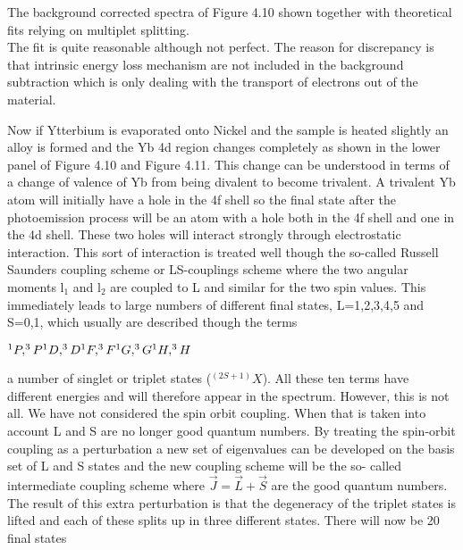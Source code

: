              The background corrected
        spectra of Figure 4.10 shown together with theoretical fits
        relying on multiplet splitting.\\

             The fit is quite reasonable although not perfect. The
          reason for discrepancy is that intrinsic energy loss
          mechanism are not included in the background subtraction
          which is only dealing with the transport of electrons out of
          the material.




             Now if Ytterbium is evaporated onto Nickel and the sample
          is heated slightly an alloy is formed and the Yb 4d region
          changes completely as shown in the lower panel of Figure 4.10
          and Figure 4.11. This change can be understood in terms of a
          change of valence of Yb from being divalent to become
          trivalent. A trivalent Yb atom will initially have a hole in
          the 4f shell so the final state after the photoemission
          process will be an atom with a hole both in the 4f shell and
          one in the 4d shell. These two holes will interact strongly
          through electrostatic interaction. This sort of interaction
          is treated well though the so-called Russell Saunders
          coupling scheme or LS-couplings scheme where the two angular
          moments l$_{1}$ and l$_{2}$ are coupled to L and similar for
          the two spin values. This immediately leads to large numbers
          of different final states, L=1,2,3,4,5 and S=0,1, which
          usually are described though the terms\\

 \vspace{0.3cm}

     \noindent     $^{1}P, ^{3}P\\ ^{1}D, ^{3}D\\ ^{1}F, ^{3}F\\ ^{1}G, ^{3}G\\
          ^{1}H, ^{3}H $\\

          \vspace{0.3cm}

           a number of singlet or triplet
          states ($^{(2S+1)}X$). All these ten terms have different
          energies and will therefore appear in the spectrum. However,
          this is not all. We have not considered the spin orbit
          coupling. When that is taken into account L and S are no
         longer good quantum numbers. By treating the spin-orbit
          coupling as a perturbation a new set of eigenvalues can be
          developed on the basis set of L and S states and the new
          coupling scheme will be the so- called intermediate coupling
          scheme where $\vec{J} = \vec{L}+ \vec{S}$ are the good
          quantum numbers. The result of this extra perturbation is
          that the degeneracy of the triplet states is lifted and each
          of these splits up in three different states. There will now
          be 20 final states\\

